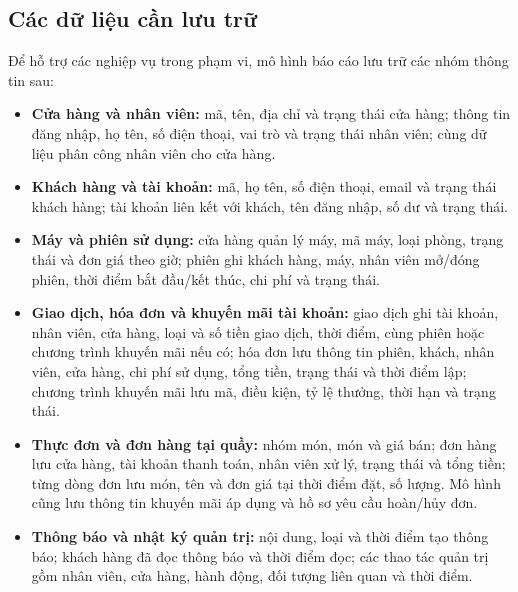 \subsection{Các dữ liệu cần lưu trữ}
Để hỗ trợ các nghiệp vụ trong phạm vi, mô hình báo cáo lưu trữ các nhóm thông tin sau:
\begin{itemize}
  \item \textbf{Cửa hàng và nhân viên:} mã, tên, địa chỉ và trạng thái cửa hàng; thông tin đăng nhập, họ tên, số điện thoại, vai trò và trạng thái nhân viên; cùng dữ liệu phân công nhân viên cho cửa hàng.
  \item \textbf{Khách hàng và tài khoản:} mã, họ tên, số điện thoại, email và trạng thái khách hàng; tài khoản liên kết với khách, tên đăng nhập, số dư và trạng thái.
  \item \textbf{Máy và phiên sử dụng:} cửa hàng quản lý máy, mã máy, loại phòng, trạng thái và đơn giá theo giờ; phiên ghi khách hàng, máy, nhân viên mở/đóng phiên, thời điểm bắt đầu/kết thúc, chi phí và trạng thái.
  \item \textbf{Giao dịch, hóa đơn và khuyến mãi tài khoản:} giao dịch ghi tài khoản, nhân viên, cửa hàng, loại và số tiền giao dịch, thời điểm, cùng phiên hoặc chương trình khuyến mãi nếu có; hóa đơn lưu thông tin phiên, khách, nhân viên, cửa hàng, chi phí sử dụng, tổng tiền, trạng thái và thời điểm lập; chương trình khuyến mãi lưu mã, điều kiện, tỷ lệ thưởng, thời hạn và trạng thái.
  \item \textbf{Thực đơn và đơn hàng tại quầy:} nhóm món, món và giá bán; đơn hàng lưu cửa hàng, tài khoản thanh toán, nhân viên xử lý, trạng thái và tổng tiền; từng dòng đơn lưu món, tên và đơn giá tại thời điểm đặt, số lượng. Mô hình cũng lưu thông tin khuyến mãi áp dụng và hồ sơ yêu cầu hoàn/hủy đơn.
  \item \textbf{Thông báo và nhật ký quản trị:} nội dung, loại và thời điểm tạo thông báo; khách hàng đã đọc thông báo và thời điểm đọc; các thao tác quản trị gồm nhân viên, cửa hàng, hành động, đối tượng liên quan và thời điểm.
\end{itemize}

